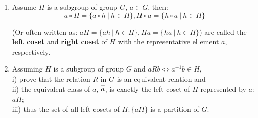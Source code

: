 \documentclass[12pt]{scrartcl}
\begin{document}
{{\begin{enumerate}[label=(\alph*)]
\begin{spacing}{1.2}
{\begin{minipage}{35em}
		\vspace{0.6em}
		$2 \Rightarrow 3:$ \\
We have $b \in H \Longrightarrow b^{-1} \in H$, and $a, b^{-1} \in H$. Thus, $a \circ b^{-1} \in H$.

		\vspace{0.6em}
		$3 \Rightarrow 1:$ \\
We have $a, a \in H \Longrightarrow a \circ a^{-1} \in H$, which means $e \in H \Longrightarrow H$ has identity element in it. Then, we have $e, b \in H \Longrightarrow e \circ b^{-1} \in H$, which means $b^{-1} \in H \Longrightarrow$ every element in $H$ has its corresponding inverse element. Because $a, b^{-1} \in H \Longrightarrow a \circ (b^{-1})^{-1} \in H$, which means $a \circ b \in H$, indicating the closure property of the operation of $H$. Additionally, the operation of the elements in $H$ satisfies the associative law because $H$ is a subset of a group $G$. Therefore, $H$ is a group respect to the operation of $G$.

		\vspace{0.2em}
 	\end{minipage}}\end{spacing}

	\item Assume $H$ is a subgroup of group $G$, $a \in G$, then:
	$$a \circ H = \{a \circ h ~ | ~ h \in H\}, H \circ a = \{h \circ a ~ | ~ h \in H\}$$
	\begin{spacing}{1.2}(Or often written as:
	$aH = \{ah ~ | ~ h \in H\}, Ha = \{ha ~ | ~ h \in H\}$) are called the \underline{\textbf{left coset}\vphantom{y}} and \underline{\textbf{right coset}} of $H$ with the representative el ement $a$, respectively.\end{spacing}

	\item \begin{spacing}{1.2}Assuming $H$ is a subgroup of group $G$ and $aRb \iff a^{-1}b \in H,$\\ i) prove that the relation $R$ in $G$ is an equivalent relation and \\ii) the equivalent class of $a$, $\overline{a\vphantom{b}}$, is exactly the left coset of $H$ represented by $a$: $aH$; \\iii) thus the set of all left cosets of $H: \{aH\}$ is a partition of $G$.


\end{spacing}
\end{enumerate}}}
\end{document}
